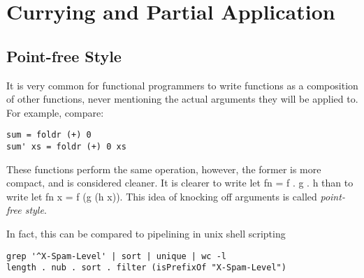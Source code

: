 
\chapter{Currying and Partial Application}





\section{Point-free Style}

It is very common for functional programmers to write functions as a composition of other functions, never mentioning the actual arguments they will be applied to. For example, compare:

\begin{lstlisting}
sum = foldr (+) 0
sum' xs = foldr (+) 0 xs
\end{lstlisting}

These functions perform the same operation, 
however, the former is more compact, and is considered cleaner.
It is clearer to write let fn = f . g . h than to write let fn x = f (g (h x)).
This idea of knocking off arguments is called \textit{point-free style}. 

In fact, this can be compared to pipelining in unix shell scripting

\begin{lstlisting}
grep '^X-Spam-Level' | sort | unique | wc -l
length . nub . sort . filter (isPrefixOf "X-Spam-Level")
\end{lstlisting}